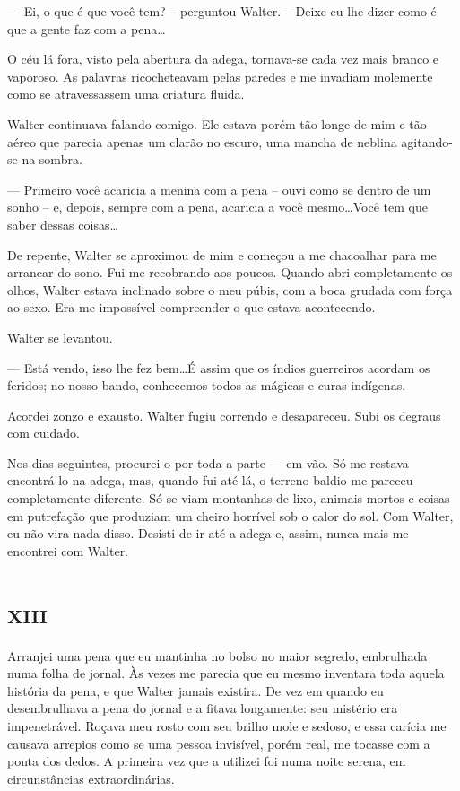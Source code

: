 --- Ei, o que é que você tem? -- perguntou Walter. -- Deixe eu lhe dizer como é que a gente faz com a pena\dots

O céu lá fora, visto pela abertura da adega, tornava-se cada vez mais branco e vaporoso. As palavras ricocheteavam pelas paredes e me invadiam molemente como se atravessassem uma criatura fluida.

Walter continuava falando comigo. Ele estava porém tão longe de mim e tão aéreo que parecia apenas um clarão no escuro, uma mancha de neblina agitando-se na sombra.

--- Primeiro você acaricia a menina com a pena -- ouvi como se dentro de um sonho -- e, depois, sempre com a pena, acaricia a você mesmo\dots Você tem que saber dessas coisas\dots

De repente, Walter se aproximou de mim e começou a me chacoalhar para me arrancar do sono. Fui me recobrando aos poucos. Quando abri completamente os olhos, Walter estava inclinado sobre o meu púbis, com a boca grudada com força ao sexo. Era-me impossível compreender o que estava acontecendo.

Walter se levantou.

--- Está vendo, isso lhe fez bem\dots É assim que os índios guerreiros acordam os feridos; no nosso bando, conhecemos todos as mágicas e curas indígenas.

Acordei zonzo e exausto. Walter fugiu correndo e desapareceu. Subi os degraus com cuidado.

Nos dias seguintes, procurei-o por toda a parte --- em vão. Só me restava encontrá-lo na adega, mas, quando fui até lá, o terreno baldio me pareceu completamente diferente. Só se viam montanhas de lixo, animais mortos e coisas em putrefação que produziam um cheiro horrível sob o calor do sol. Com Walter, eu não vira nada disso. Desisti de ir até a adega e, assim, nunca mais me encontrei com Walter.


\chapter*{\huge\centering\textsc{xiii}}

Arranjei uma pena que eu mantinha no bolso no maior segredo, embrulhada numa folha de jornal. Às vezes me parecia que eu mesmo inventara toda aquela história da pena, e que Walter jamais existira. De vez em quando eu desembrulhava a pena do jornal e a fitava longamente: seu mistério era impenetrável. Roçava meu rosto com seu brilho mole e sedoso, e essa carícia me causava arrepios como se uma pessoa invisível, porém real, me tocasse com a ponta dos dedos. A primeira vez que a utilizei foi numa noite serena, em circunstâncias extraordinárias.

